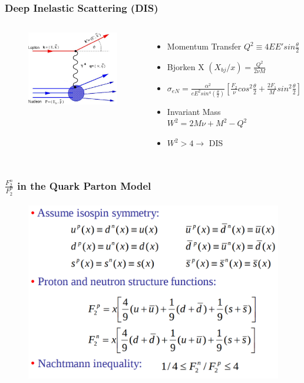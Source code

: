 \documentclass{beamer}
\begin{document}
\begin{frame}
\frametitle{Deep Inelastic Scattering (DIS)}
\begin{columns}[c] %
	
	\begin{figure}
		\includegraphics[width =5cm]{../images/DIS}
	\end{figure}
	
	
	\begin{itemize}
		\item Momentum Transfer $ Q^2 \equiv 4EE' sin \frac{\theta}{2} $
		\item Bjorken X $(X_{bj}/x) = \frac{Q^2}{2\nu M}$
		\item $\sigma_{eN} = \frac{\alpha^2}{eE^2sin^4(\frac{\theta}{2})} [\frac{F_2}{\nu}cos^2\frac{\theta}{2} + \frac{2F_1}{M}sin^2\frac{\theta}{2}] $
		\item Invariant Mass $W^2 = 2M\nu + M^2 - Q^2$
		\item $W^2 > 4 \rightarrow$ DIS
	\end{itemize}
	
	
	
\end{columns}
\end{frame}
\begin{frame}
\frametitle{$\frac{F_2^n}{F_2^p}$ in the Quark Parton Model}
\vspace{-15pt}

\begin{figure}
\includegraphics[width =11.5cm]{../images/parton_mod.png}
\end{figure}

\end{frame}
\end{document}
